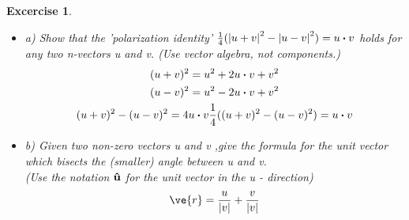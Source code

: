 \documentclass[11pt]{article}
\newtheorem{excercise}{Excercise}
\begin{document}
    \begin{excercise}

        \begin{itemize}
            \item a) Show that the 'polarization identity' $\frac{1}{4}(\abs{u+v}^2 - \abs{u-v}^2)=u\vdot v$ holds for any two n-vectors u and v. (Use vector algebra, not components.)\\
            \begin{gather}
                (u + v)^2 = u^2 + 2u\vdot v + v^2 \\
                (u - v)^2 = u^2 - 2u\vdot v + v^2 \\
                (u + v)^2 - (u - v)^2 = 4u \vdot v
                \frac{1}{4}((u + v)^2 - (u - v)^2 ) = u \vdot v
            \end{gather}
            \item b) Given two non-zero vectors u and v ,give the formula for the unit vector which bisects the (smaller) angle between u and v.\\
            (Use the notation $\vu{u}$ for the unit vector in the u - direction)\\
            \begin{gather}
                      \ve{r}=\frac{u}{\abs{v}} + \frac{v}{\abs{v}}
            \end{gather}
        \end{itemize}
    \end{excercise}
\end{document}
